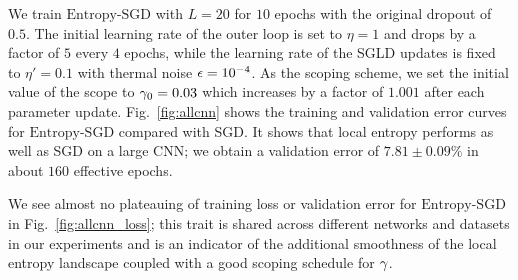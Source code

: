 \documentclass[10pt]{article}
\newcommand{\entropysgd}{\mathrm{Entropy}\textrm{-}\mathrm{SGD}}
\begin{document}
We train $\entropysgd$ with $L = 20$ for $10$ epochs with the original dropout of $0.5$. The initial learning rate of the outer loop is set to $\eta = 1$ and drops by a factor of $5$ every $4$ epochs, while the learning rate of the SGLD updates is fixed to $\eta' = 0.1$ with thermal noise $\epsilon = 10^{-4}$. As the scoping scheme, we set the initial value of the scope to $\gamma_0 = 0.03$ which increases by a factor of $1.001$ after each parameter update.
%
Fig.~\ref{fig:allcnn} shows the training and validation error curves for $\entropysgd$ compared with SGD. It shows that local entropy performs as well as SGD on a large CNN; we obtain a validation error of $7.81 \pm 0.09 \%$ in about $160$ effective epochs.

We see almost no plateauing of training loss or validation error for $\entropysgd$ in Fig.~\ref{fig:allcnn_loss}; this trait is shared across different networks and datasets in our experiments and is an indicator of the additional smoothness of the local entropy landscape coupled with a good scoping schedule for $\gamma$.
\end{document}

